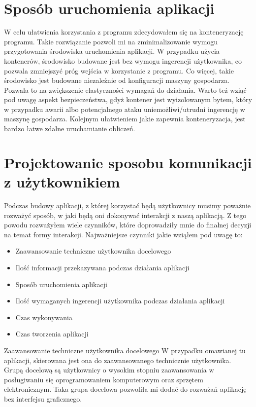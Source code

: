 \documentclass[a4paper,12pt,twoside,openany]{report}
\begin{document}
  \section{Sposób uruchomienia aplikacji}
    W celu ułatwienia korzystania z programu zdecydowałem się na konteneryzację programu. Takie rozwiązanie pozwoli mi na 
    zminimalizowanie wymogu przygotowania środowiska uruchomienia aplikacji. W przypadku użycia kontenerów, środowisko
    budowane jest bez wymogu ingerencji użytkownika, co pozwala zmniejszyć próg wejścia w korzystanie z programu.
    Co więcej, takie środowisko jest budowane niezależnie od konfiguracji maszyny gospodarza. Pozwala to na zwiększenie
    elastyczności wymagań do działania. Warto też wziąć pod uwagę aspekt bezpieczeństwa, gdyż kontener jest wyizolowanym bytem, 
    który w przypadku awarii albo potencjalnego ataku uniemożliwi/utrudni ingerencję w maszynę gospodarza.
    Kolejnym ułatwieniem jakie zapewnia konteneryzacja, jest bardzo łatwe zdalne uruchamianie obliczeń.

  \section{Projektowanie sposobu komunikacji z użytkownikiem}
    Podczas budowy aplikacji, z której korzystać będą użytkownicy musimy poważnie rozważyć sposób, w jaki będą oni 
    dokonywać interakcji z naszą aplikacją. Z tego powodu rozważyłem wiele czynników, które doprowadziły mnie 
    do finalnej decyzji na temat formy interakcji. Najważniejsze czynniki jakie wziąłem pod uwagę to:
    \begin{itemize}
      \item Zaawansowanie techniczne użytkownika docelowego
      \item Ilość informacji przekazywana podczas działania aplikacji
      \item Sposób uruchomienia aplikacji
      \item Ilość wymaganych ingerencji użytkownika podczas działania aplikacji
      \item Czas wykonywania
      \item Czas tworzenia aplikacji
    \end{itemize}

    \begin{subsection}{Zaawansowanie techniczne użytkownika docelowego}
      W przypadku omawianej tu aplikacji, skierowana jest ona do zaawansowanego technicznie użytkownika. Grupą docelową 
      są użytkownicy o wysokim stopniu zaawansowania w posługiwaniu się oprogramowaniem komputerowym oraz sprzętem elektronicznym.
      Taka grupa docelowa pozwoliła mi dodać do rozważań aplikację bez interfejsu graficznego.
    \end{subsection}
    
\end{document}
